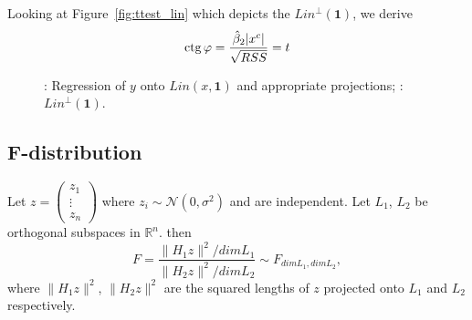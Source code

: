 Looking at Figure~\ref{fig:ttest_lin} which depicts the $Lin^{\perp}(\mathbf{1})$,
we derive
\[
\operatorname{ctg} \varphi = \frac{\hat \beta_2 \vert x^c \vert}{\sqrt{RSS}} = t
\]

\begin{figure}[ht!]
\begin{center}
\caption{: Regression of $y$ onto $Lin(x, \mathbf{1})$ and appropriate projections;
: $Lin^{\perp}(\mathbf{1})$.}
\end{center}
\end{figure}


\subsection{F-distribution}


\begin{definition}\label{def:f}
Let $z = \begin{pmatrix} z_1 \\ \vdots \\ z_n \end{pmatrix}$
where $z_i \sim \mathcal{N}(0, \sigma^2)$ and are independent.
Let $L_1$, $L_2$ be orthogonal subspaces in $\mathbb{R}^n$.
then
\[
F = \frac{\lVert H_1 z \rVert^2 / dim L_1}{\lVert H_2 z \rVert^2 / dim L_2} \sim F_{dim L_1, dim L_2},
\]
where $\lVert H_1 z \rVert^2$, $\lVert H_2 z \rVert^2$ are the squared lengths
of $z$ projected onto $L_1$ and $L_2$ respectively.
\end{definition}


